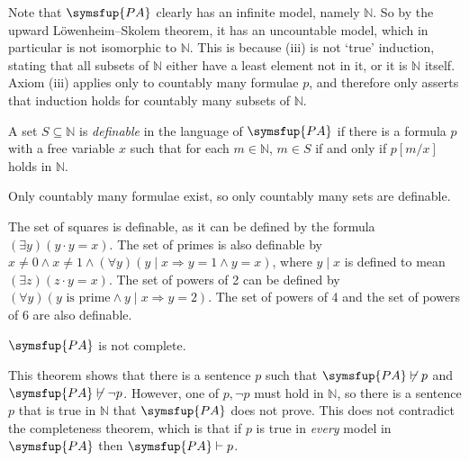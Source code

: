 Note that \( \symsfup{PA} \) clearly has an infinite model, namely \( \mathbb N \).
So by the upward L\"owenheim--Skolem theorem, it has an uncountable model, which in particular is not isomorphic to \( \mathbb N \).
This is because (iii) is not `true' induction, stating that all subsets of \( \mathbb N \) either have a least element not in it, or it is \( \mathbb N \) itself.
Axiom (iii) applies only to countably many formulae \( p \), and therefore only asserts that induction holds for countably many subsets of \( \mathbb N \).
\begin{definition}
    A set \( S \subseteq \mathbb N \) is \emph{definable} in the language of \( \symsfup{PA} \) if there is a formula \( p \) with a free variable \( x \) such that for each \( m \in \mathbb N \), \( m \in S \) if and only if \( p[m/x] \) holds in \( \mathbb N \).
\end{definition}
Only countably many formulae exist, so only countably many sets are definable.
\begin{example}
    The set of squares is definable, as it can be defined by the formula \( (\exists y)(y\cdot y = x) \).
    The set of primes is also definable by \( x \neq 0 \wedge x \neq 1 \wedge (\forall y)(y \mid x \Rightarrow y = 1 \wedge y = x) \), where \( y \mid x \) is defined to mean \( (\exists z)(z \cdot y = x) \).
    The set of powers of 2 can be defined by \( (\forall y)(y \text{ is prime} \wedge y \mid x \Rightarrow y = 2) \).
    The set of powers of 4 and the set of powers of 6 are also definable.
\end{example}
\begin{theorem}
    \( \symsfup{PA} \) is not complete.
\end{theorem}
This theorem shows that there is a sentence \( p \) such that \( \symsfup{PA} \not\vdash p \) and \( \symsfup{PA} \not\vdash \neg p \).
However, one of \( p, \neg p \) must hold in \( \mathbb N \), so there is a sentence \( p \) that is true in \( \mathbb N \) that \( \symsfup{PA} \) does not prove.
This does not contradict the completeness theorem, which is that if \( p \) is true in \emph{every} model in \( \symsfup{PA} \) then \( \symsfup{PA} \vdash p \).
